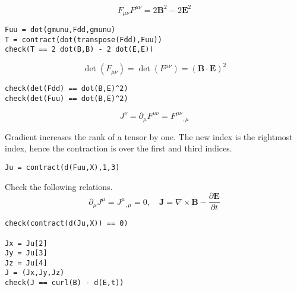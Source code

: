 \documentclass[12pt]{article}
\begin{document}
\begin{equation*}
F_{\mu\nu}F^{\mu\nu}=2\mathbf B^2-2\mathbf E^2
\end{equation*}
{\footnotesize
\begin{verbatim}
Fuu = dot(gmunu,Fdd,gmunu)
T = contract(dot(transpose(Fdd),Fuu))
check(T == 2 dot(B,B) - 2 dot(E,E))
\end{verbatim}}

\begin{equation*}
\det(F_{\mu\nu})=\det(F^{\mu\nu})=(\mathbf B\cdot\mathbf E)^2
\end{equation*}
{\footnotesize
\begin{verbatim}
check(det(Fdd) == dot(B,E)^2)
check(det(Fuu) == dot(B,E)^2)
\end{verbatim}}

\begin{equation*}
J^\nu
=\partial_\mu F^{\mu\nu}
=F^{\mu\nu}{}_{,\mu}
\end{equation*}

Gradient increases the rank of a tensor by one.
The new index is the rightmost index,
hence the contraction is over the first and third indices.
{\footnotesize
\begin{verbatim}
Ju = contract(d(Fuu,X),1,3)
\end{verbatim}}

Check the following relations.
\begin{equation*}
\partial_\mu J^\mu=J^\mu{}_{,\mu}=0,
\quad\mathbf J=\nabla\times\mathbf B-\frac{\partial\mathbf E}{\partial t}
\end{equation*}
{\footnotesize
\begin{verbatim}
check(contract(d(Ju,X)) == 0)

Jx = Ju[2]
Jy = Ju[3]
Jz = Ju[4]
J = (Jx,Jy,Jz)
check(J == curl(B) - d(E,t))
\end{verbatim}}
\end{document}
